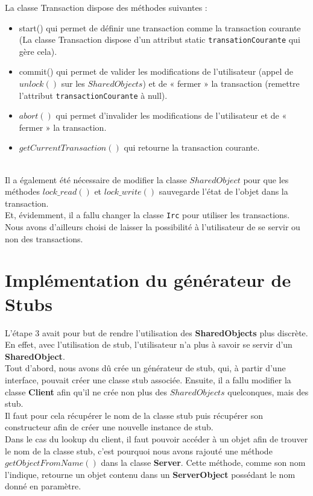 \documentclass[11pt,a4paper]{report}
\begin{document}
La classe Transaction dispose des méthodes suivantes :
\begin{itemize}
\item start() qui permet de définir une transaction comme la transaction courante (La classe Transaction dispose d’un attribut static \texttt{transationCourante}  qui gère cela).
\item commit() qui permet de valider les modifications de l’utilisateur (appel de $unlock()$ sur les $SharedObjects$) et de « fermer » la transaction (remettre l’attribut \texttt{transactionCourante} à null).
\item $abort()$ qui permet d’invalider les modifications de l’utilisateur et de « fermer » la transaction.
\item $getCurrentTransaction()$ qui retourne la transaction courante.\\\\
\end{itemize}


Il a également été nécessaire de modifier la classe $SharedObject$ pour que les méthodes $lock\_read()$ et $lock\_write()$ sauvegarde l’état de l’objet dans la transaction.\\ Et, évidemment, il a fallu changer la classe \texttt{Irc}  pour utiliser les transactions. Nous avons d’ailleurs choisi de laisser la possibilité à l’utilisateur de se servir ou non des transactions.


\section{Implémentation du générateur de Stubs}

L'étape 3 avait pour but de rendre l’utilisation des \textbf{SharedObjects}  plus discrète. En effet, avec l’utilisation de stub, l’utilisateur n’a plus à savoir se servir d’un   \textbf{SharedObject}.\\
Tout d’abord, nous avons dû crée un générateur de stub, qui, à partir d’une interface, pouvait créer une classe stub associée.
Ensuite, il a fallu modifier la classe \textbf{Client} afin qu’il ne crée non plus des $SharedObjects$ quelconques, mais des stub.\\ Il faut pour cela récupérer le nom de la classe stub puis récupérer son constructeur afin de créer une nouvelle instance de stub.\\
 Dans le cas du lookup du client, il faut pouvoir accéder à un objet afin de trouver le nom de la classe stub, c’est pourquoi nous avons rajouté une méthode $getObjectFromName()$ dans la classe \textbf{Server}. Cette méthode, comme son nom l’indique, retourne un objet contenu dans un \textbf{ServerObject}  possédant le nom donné en paramètre.
 
\end{document}
